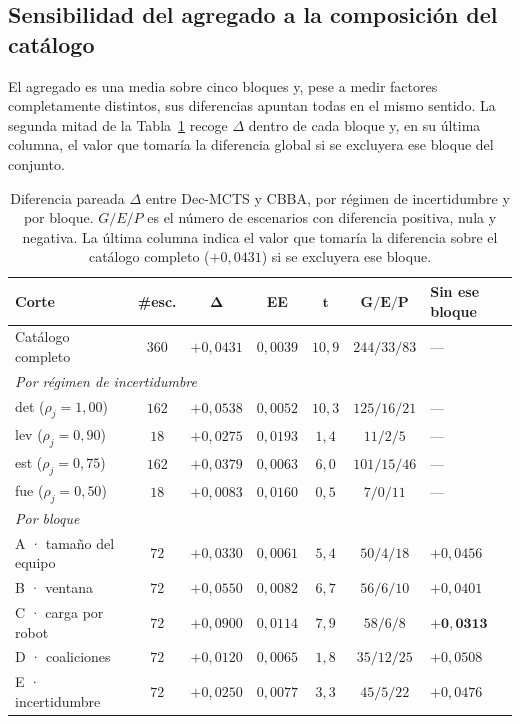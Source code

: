 \subsection{Sensibilidad del agregado a la composición del catálogo} \label{subsec:exp-composicion}

El agregado es una media sobre cinco bloques y, pese a medir factores completamente distintos, sus diferencias apuntan todas en el mismo sentido. La segunda mitad de la Tabla~\ref{tab:res-delta} recoge $\Delta$ dentro de cada bloque y, en su última columna, el valor que tomaría la diferencia global si se excluyera ese bloque del conjunto.

\begin{table}[t]
\centering
\caption{Diferencia pareada $\Delta$ entre Dec-MCTS y CBBA, por régimen de incertidumbre y por bloque. $G/E/P$ es el número de escenarios con diferencia positiva, nula y negativa. La última columna indica el valor que tomaría la diferencia sobre el catálogo completo ($+0{,}0431$) si se excluyera ese bloque.}
\label{tab:res-delta}
\small
\begin{tabular}{lcccccl}
\hline
\textbf{Corte} & \textbf{\#esc.} & $\boldsymbol{\Delta}$ & \textbf{EE} & $\boldsymbol{t}$ & $\boldsymbol{G/E/P}$ & \textbf{Sin ese bloque} \\
\hline
Catálogo completo & $360$ & $+0{,}0431$ & $0{,}0039$ & $10{,}9$ & $244/33/83$ & --- \\
\hline
\multicolumn{7}{l}{\emph{Por régimen de incertidumbre}} \\
\quad det ($\rho_j=1{,}00$)  & $162$ & $+0{,}0538$ & $0{,}0052$ & $10{,}3$ & $125/16/21$ & --- \\
\quad lev ($\rho_j=0{,}90$)  & $18$  & $+0{,}0275$ & $0{,}0193$ & $1{,}4$  & $11/2/5$    & --- \\
\quad est ($\rho_j=0{,}75$)  & $162$ & $+0{,}0379$ & $0{,}0063$ & $6{,}0$  & $101/15/46$ & --- \\
\quad fue ($\rho_j=0{,}50$)  & $18$  & $+0{,}0083$ & $0{,}0160$ & $0{,}5$  & $7/0/11$    & --- \\
\hline
\multicolumn{7}{l}{\emph{Por bloque}} \\
\quad A · tamaño del equipo  & $72$ & $+0{,}0330$ & $0{,}0061$ & $5{,}4$ & $50/4/18$  & $+0{,}0456$ \\
\quad B · ventana            & $72$ & $+0{,}0550$ & $0{,}0082$ & $6{,}7$ & $56/6/10$  & $+0{,}0401$ \\
\quad C · carga por robot    & $72$ & $+0{,}0900$ & $0{,}0114$ & $7{,}9$ & $58/6/8$   & $\mathbf{+0{,}0313}$ \\
\quad D · coaliciones        & $72$ & $+0{,}0120$ & $0{,}0065$ & $1{,}8$ & $35/12/25$ & $+0{,}0508$ \\
\quad E · incertidumbre      & $72$ & $+0{,}0250$ & $0{,}0077$ & $3{,}3$ & $45/5/22$  & $+0{,}0476$ \\
\hline
\end{tabular}
\end{table}

